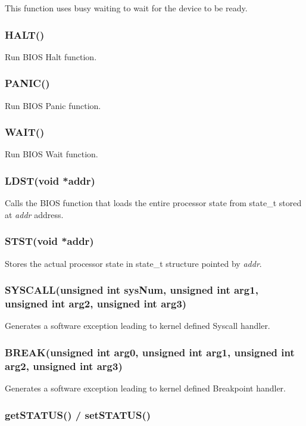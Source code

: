 This function uses busy waiting to wait for the device to be ready.

\subsubsection{HALT()}

Run BIOS Halt function.

\subsubsection{PANIC()}

Run BIOS Panic function.

\subsubsection{WAIT()}

Run BIOS Wait function.

\subsubsection{LDST(void *addr)}

Calls the BIOS function that loads the entire processor state from state\_t stored at \emph{addr} address.

\subsubsection{STST(void *addr)}

Stores the actual processor state in state\_t structure pointed by \emph{addr}.

\subsubsection{SYSCALL(unsigned int sysNum, unsigned int arg1, unsigned int arg2, unsigned int arg3)}

Generates a software exception leading to kernel defined Syscall handler.

\subsubsection{BREAK(unsigned int arg0, unsigned int arg1, unsigned int arg2, unsigned int arg3)}

Generates a software exception leading to kernel defined Breakpoint handler.

\subsubsection{getSTATUS() / setSTATUS()}

